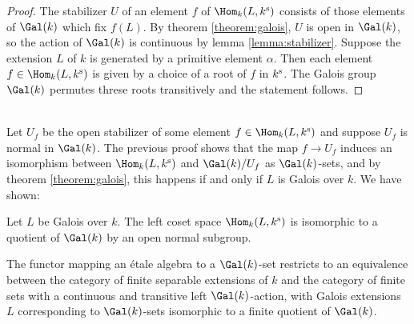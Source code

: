 \begin{proof}
	The stabilizer $U$ of an element $f$ of $\Hom_k(L, k^\sep)$ consists of those elements of $\Gal(k)$ which fix $f(L)$. By theorem \ref{theorem:galois}, $U$ is open in $\Gal(k)$, so the action of $\Gal(k)$ is continuous by lemma \ref{lemma:stabilizer}. Suppose the extension $L$ of $k$ is generated by a primitive element $\alpha$. Then each element $f \in \Hom_k(L, k^\sep)$ is given by a choice of a root of $f$ in $k^{\text{s}}$. The Galois group $\Gal(k)$ permutes threse roots transitively and the statement follows.
\end{proof}\\

Let $U_f$ be the open stabilizer of some element $f \in \Hom_k(L, k^\sep)$ and suppose $U_f$ is normal in $\Gal(k)$. The previous proof shows that the map $f \to U_f$ induces an isomorphism between $\Hom_k(L, k^\sep)$ and $\Gal(k)/U_f$ as $\Gal(k)$-sets, and by theorem \ref{theorem:galois}, this happens if and only if $L$ is Galois over $k$. We have shown:

\begin{theorem}
	Let $L$ be Galois over $k$. The left coset space $\Hom_k(L, k^\sep)$ is isomorphic to a quotient of $\Gal(k)$ by an open normal subgroup.
\end{theorem}

\begin{theorem}
	The functor mapping an \'etale algebra to a $\Gal(k)$-set restricts to an equivalence between the category of finite separable extensions of $k$ and the category of finite sets with a continuous and transitive left $\Gal(k)$-action, with Galois extensions $L$ corresponding to $\Gal(k)$-sets isomorphic to a finite quotient of $\Gal(k)$.
\end{theorem}

